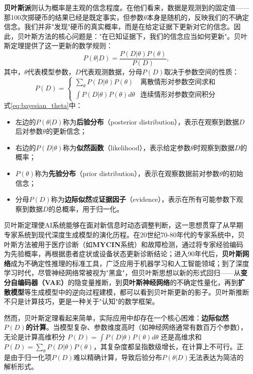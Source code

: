 \textbf{贝叶斯派}则认为概率是主观的信念程度。在他们看来，数据是观测到的固定值——那100次掷硬币的结果已经是既定事实，但参数$\theta$本身是随机的，反映我们的不确定信念。我们并非"发现"硬币的真实概率，而是在给定证据下更新对它的信念。因此，贝叶斯方法的核心问题是："在已知证据下，我们的信念应当如何更新"。贝叶斯定理提供了这一更新的数学规则：
\begin{equation}\label{eq:bayesian_theta}
P(\theta|D) = \frac{P(D|\theta)P(\theta)}{P(D)},
\end{equation}
其中，$\theta$代表模型参数，$D$代表观测数据，分母$P(D)$取决于参数空间的性质：
$$
P(D)=\left\{\begin{array}{ll}  \sum_{\theta} P(D|\theta)P(\theta) & \mbox{离散情形对参数空间求和}\\
  \int P(D|\theta)P(\theta)d\theta &\mbox{连续情形对参数空间积分}
\end{array}\right.
$$
式\eqref{eq:bayesian_theta}中：
\begin{itemize}
  \item 左边的$P(\theta|D)$称为\textbf{后验分布}（posterior distribution），表示在观察到数据$D$后对参数$\theta$的更新信念；
  \item 右边的$P(D|\theta)$称为\textbf{似然函数}（likelihood），表示给定参数$\theta$时观察到数据$D$的概率；
  \item $P(\theta)$称为\textbf{先验分布}（prior distribution），表示在观察数据前对参数$\theta$的初始信念；
  \item 分母$P(D)$称为\textbf{边际似然}或\textbf{证据因子}（evidence），表示在所有可能参数下观察到数据$D$的总概率，用于归一化。
\end{itemize}

贝叶斯定理使AI系统能够在面对新信息时动态调整判断，这一思想贯穿了从早期专家系统到现代深度生成模型的演化历程。在20世纪70-80年代的专家系统中，贝叶斯方法被用于医疗诊断（如\textbf{MYCIN}系统）和故障检测，通过将专家经验编码为先验概率，再根据患者症状或设备状态更新诊断结论；进入90年代后，\textbf{贝叶斯网络}成为不确定性推理的标准工具，广泛应用于机器学习和人工智能领域；到了深度学习时代，尽管神经网络常被视为"黑盒"，但贝叶斯思想以新的形式回归——从\textbf{变分自编码器（VAE）}的隐变量推断，到\textbf{贝叶斯神经网络}的不确定性量化，再到\textbf{扩散模型}等生成模型中的逆向过程建模，都可以看到贝叶斯更新的影子。贝叶斯推断不只是计算技巧，更是一种关于"认知"的数学框架。

然而，贝叶斯定理看起来简单，实际应用中却存在一个核心困难：\textbf{边际似然$P(D)$的计算}。当模型复杂、参数维度高时（如神经网络通常有数百万个参数），无论是计算高维积分 $P(D) = \int P(D|\theta)P(\theta)d\theta$ 还是高维求和 $P(D) = \sum_{\theta} P(D|\theta)P(\theta)$，其复杂度都呈指数级增长，在计算上不可行。正是由于归一化项$P(D)$难以精确计算，导致后验分布$P(\theta|D)$无法表达为简洁的解析形式。

